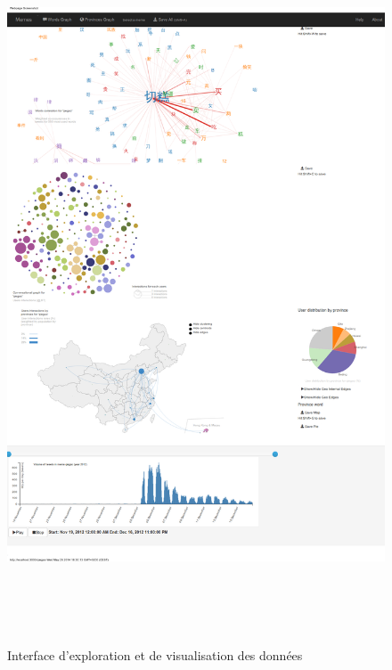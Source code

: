 \begin{figure}
    \label{fig:ui-screenshot}
    \centering
    \includegraphics[width=6.7213in,height=8.3894in]{figures/chap4/ui/ui-screenshot.png}
    \caption{Interface d'exploration et de visualisation des données}
\end{figure}

